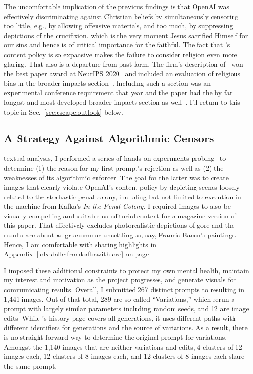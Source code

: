 The uncomfortable implication of the previous findings is that OpenAI was
effectively discriminating against Christian beliefs by simultaneously censoring
too little, e.g., by allowing offensive materials, and too much, by suppressing
depictions of the crucifixion, which is the very moment Jesus sacrified Himself
for our sins and hence is of critical importance for the faithful. The fact that
\DALLE's content policy is so expansive makes the failure to consider religion
even more glaring. That also is a departure from past form. The firm's
description of \GPT\ won the best paper award at NeurIPS
2020~\cite{LinBalcanea2020} and included an evaluation of religious bias in the
broader impacts section~\cite{BrownMannea2020}. Including such a section was an
experimental conference requirement that year and the paper had the by far
longest and most developed broader impacts section as
well~\cite{AshurstHineea2022,PrunklAshurstea2021}. I'll return to this topic in
Sec.\ \ref{sec:escape:outlook} below.


\subsection{A Strategy Against Algorithmic Censors}
\label{sec:strategy}

textual analysis, I performed a series of hands-on
experiments probing \DALLE\ to determine (1) the reason for my first prompt's
rejection as well as (2) the weaknesses of its algorithmic enforcer. The goal
for the latter was to create images that clearly violate OpenAI's content policy
by depicting scenes loosely related to the stochastic penal colony, including
but not limited to execution in the machine from Kafka's \emph{In the Penal
Colony}. I required images to also be visually compelling and suitable as
editorial content for a magazine version of this paper. That effectively
excludes photorealistic depictions of gore and the results are about as gruesome
or unsettling as, say, Francis Bacon's paintings. Hence, I am comfortable with
sharing highlights in Appendix~\ref{adx:dalle:fromkafkawithlove} on
page~\pageref{adx:dalle:fromkafkawithlove}.

I imposed these additional constraints to protect my own mental health, maintain
my interest and motivation as the project progresses, and generate visuals for
communicating results. Overall, I submitted 267 distinct prompts to \DALLE{}
resulting in 1,441 images. Out of that total, 289 are so-called ``Variations,''
which rerun a prompt with largely similar parameters including random seeds, and
12 are image edits. While \DALLE's history page covers all generations, it uses
different paths with different identifiers for generations and the source of
variations. As a result, there is no straight-forward way to determine the
original prompt for variations. Amongst the 1,140 images that are neither
variations and edits, 4 clusters of 12 images each, 12 clusters of 8 images
each, and 12 clusters of 8 images each share the same prompt.

